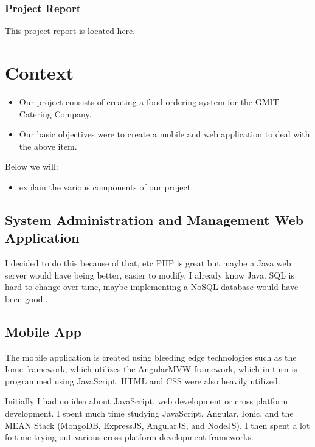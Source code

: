 \subsection*{\href{https://github.com/GMIT-Catering/final-year-project-template}{Project Report}}
This project report is located here.

\chapter{Context}	%

\begin{itemize}
\item Our project consists of creating a food ordering system for the GMIT Catering Company.
\item Our basic objectives were to create a mobile and web application to deal with the above item.
\end{itemize}

Below we will:
\begin{itemize}
\item explain the various components of our project.
\end{itemize}

\section{System Administration and Management Web Application}
I decided to do this because of that, etc
PHP is great but maybe a Java web server would have being better, easier to modify, I already know Java.
SQL is hard to change over time, maybe implementing a NoSQL database would have been good...

\section{Mobile App}
The mobile application is created using bleeding edge technologies such as the Ionic framework, which utilizes the AngularMVW framework, which in turn is programmed using JavaScript. HTML and CSS were also heavily utilized.

Initially I had no idea about JavaScript, web development or cross platform development. I spent much time studying JavaScript, Angular, Ionic, and the MEAN Stack (MongoDB, ExpressJS, AngularJS, and NodeJS). I then spent a lot fo time trying out various cross platform development frameworks.

